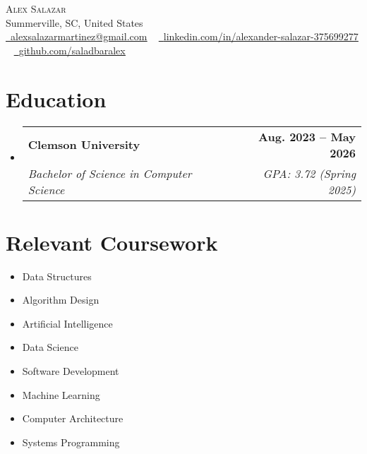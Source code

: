 \documentclass[letterpaper,11pt]{article}
\makeatletter
\newcommand{\resumeSubheading}[4]{
    \vspace{-2pt}\item[]
    \begin{tabular*}{1.0\textwidth}[t]{l@{\extracolsep{\fill}}r}
    \textbf{#1} & \textbf{\small #2} \\
    \textit{\small#3} & \textit{\small #4} \\
    \end{tabular*}\vspace{-7pt}
}
\makeatother
\begin{document}
    \begin{center}
    {\Huge \scshape Alex Salazar} \\ \vspace{1pt}
    Summerville, SC, United States \\ \vspace{1pt}
    \small \href{mailto:alexsalazarmartinez@gmail.com}{\faEnvelope\ \underline{alexsalazarmartinez@gmail.com}} ~
    \href{https://www.linkedin.com/in/alexander-salazar-375699277}{\faLinkedin\ \underline{linkedin.com/in/alexander-salazar-375699277}}  ~
    \href{https://github.com/saladbaralex}{\faGithub\ \underline{github.com/saladbaralex}}
    \vspace{-8pt}
    \end{center}

    \section{Education}
    \begin{itemize}  %
        \resumeSubheading{Clemson University}{Aug. 2023 -- May 2026}{Bachelor of Science in Computer Science}{GPA: 3.72 (Spring 2025)}
    \end{itemize}

    \section{Relevant Coursework}
    \begin{multicols}{4}
        \begin{itemize}[itemsep=-5pt, parsep=3pt]
            \item Data Structures
            \item Algorithm Design
            \item Artificial Intelligence
            \item Data Science
            \item Software Development
            \item Machine Learning
            \item Computer Architecture
            \item Systems Programming
        \end{itemize}
    \end{multicols}

\end{document}
